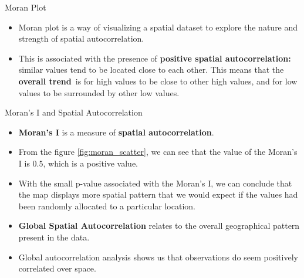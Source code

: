 \documentclass[10pt, aspectratio=169]{beamer}
\begin{document}
\begin{frame}{Moran Plot}
    \begin{itemize}
        \item Moran plot is a way of visualizing a spatial dataset to explore the nature and strength of spatial autocorrelation.
        \item This is associated with the presence of \textbf{positive spatial autocorrelation:} similar values tend to be located close to each other. This means that the \textbf{overall trend} is for high values to be close to other high values, and for low values to be surrounded by other low values.
    \end{itemize}
    
\end{frame}


\begin{frame}{Moran's I and Spatial Autocorrelation}
    \begin{itemize}
        
        \item \textbf{Moran's I} is a measure of \textbf{spatial autocorrelation}.
        \item From the figure \ref{fig:moran_scatter}, we can see that the value of the Moran's I is 0.5, which is a positive value.
        \item With the small p-value associated with the Moran's I, we can conclude that the map displays 
        more spatial pattern that we would expect if the values had been randomly allocated to a particular location.
        \item \textbf{Global Spatial Autocorrelation} relates to the overall geographical pattern present in the data.
        \item Global autocorrelation analysis shows us that observations do seem positively correlated over space. 


    \end{itemize}
   
   
\end{frame}
\end{document}
